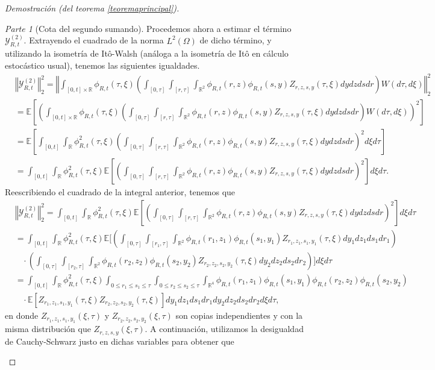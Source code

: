 \documentclass[letterpaper,twoside,12pt]{book}
\newcommand{\R}{\mathbb{R}}
\newcommand{\E}{\mathbb{E}}
\newcommand{\1}{\mathds{1}}
\newcommand{\norm}[1]{\left\Vert #1 \right\Vert}
\theoremstyle{definition}
\theoremstyle{definition}
\theoremstyle{remark}
\newtheorem{proofpart}{Parte}
\theoremstyle{definition}
\theoremstyle{definition}
\theoremstyle{definition}
\theoremstyle{definition}
\theoremstyle{definition}
\begin{document}
\begin{proof}[Demostración (del teorema \ref{teoremaprincipal})]
\begin{proofpart}[Cota del segundo sumando]
Procedemos ahora a estimar el término $\mathcal{Y}_{R,t}^{(2)}$. Extrayendo el cuadrado de la norma $L^{2}(\Omega)$ de dicho término, y utilizando la isometría de Itô-Walsh (análoga a la isometría de Itô en cálculo estocástico usual), tenemos las siguientes igualdades.
\begin{align*}
   &\norm{\mathcal{Y}_{R,t}^{(2)}}_2^{2}=\norm{\int_{[0,t]\times\R}\phi_{R,t}(\tau,\xi)\left(\int_{[0,\tau]}\int_{[r,\tau]}\int_{\R^2}\phi_{R,t}(r,z)\phi_{R,t}(s,y)Z_{r,z,s,y}(\tau,\xi)dy dz ds dr\right)W(d\tau,d\xi)}_2^2\\
   &=\E\left[\left(\int_{[0,t]\times\R}\phi_{R,t}(\tau,\xi)\left(\int_{[0,\tau]}\int_{[r,\tau]}\int_{\R^2}\phi_{R,t}(r,z)\phi_{R,t}(s,y)Z_{r,z,s,y}(\tau,\xi)dy dz ds dr\right)W(d\tau,d\xi)\right)^2\right]\\
   &=\E\left[\int_{[0,t]}\int_\R\phi_{R,t}^2(\tau,\xi)\left(\int_{[0,\tau]}\int_{[r,\tau]}\int_{\R^2}\phi_{R,t}(r,z)\phi_{R,t}(s,y)Z_{r,z,s,y}(\tau,\xi)dy dz ds dr\right)^2d\xi d\tau\right]\\
   &=\int_{[0,t]}\int_\R\phi_{R,t}^2(\tau,\xi)\E\left[\left(\int_{[0,\tau]}\int_{[r,\tau]}\int_{\R^2}\phi_{R,t}(r,z)\phi_{R,t}(s,y)Z_{r,z,s,y}(\tau,\xi)dy dz ds dr\right)^2\right]d\xi d\tau.
\end{align*}
Reescribiendo el cuadrado de la integral anterior, tenemos que 
\begin{align*}
   &\norm{\mathcal{Y}_{R,t}^{(2)}}_2^{2}=\int_{[0,t]}\int_\R\phi_{R,t}^2(\tau,\xi)\E\left[\left(\int_{[0,\tau]}\int_{[r,\tau]}\int_{\R^2}\phi_{R,t}(r,z)\phi_{R,t}(s,y)Z_{r,z,s,y}(\tau,\xi)dy dz ds dr\right)^2\right]d\xi d\tau\\
   &=\int_{[0,t]}\int_\R\phi_{R,t}^2(\tau,\xi)\E\Bigg[\left(\int_{[0,\tau]}\int_{[r_1,\tau]}\int_{\R^2}\phi_{R,t}(r_1,z_1)\phi_{R,t}(s_1,y_1)Z_{r_1,z_1,s_1,y_1}(\tau,\xi)dy_1dz_1ds_1dr_1\right)\\
   &\ \ \ \ \cdot \left(\int_{[0,\tau]}\int_{[r_2,\tau]}\int_{\R^2}\phi_{R,t}(r_2,z_2)\phi_{R,t}(s_2,y_2)Z_{r_2,z_2,s_2,y_2}(\tau,\xi)dy_2dz_2ds_2dr_2\right)\Bigg]d\xi d\tau\\
   &=\int_{[0,t]}\int_\R\phi_{R,t}^2(\tau,\xi)\int_{0\leq r_1\leq s_1\leq \tau}\int_{0\leq r_2\leq s_2\leq \tau}\int_{\R^4}\phi_{R,t}(r_1,z_1)\phi_{R,t}(s_1,y_1)\phi_{R,t}(r_2,z_2)\phi_{R,t}(s_2,y_2)\\
   &\ \ \ \ \cdot \E\left[Z_{r_1,z_1,s_1,y_1}(\tau,\xi)Z_{r_2,z_2,s_2,y_2}(\tau,\xi)\right]dy_1dz_1ds_1dr_1dy_2dz_2ds_2dr_2d\xi d\tau,
\end{align*}
en donde $Z_{r_1,z_1,s_1,y_1}(\xi,\tau)$ y $Z_{r_2,z_2,s_2,y_2}(\xi,\tau)$ son copias independientes y con la misma distribución que $Z_{r,z,s,y}(\xi,\tau)$. A continuación, utilizamos la desigualdad de Cauchy-Schwarz justo en dichas variables para obtener que 

\end{proofpart}
\end{proof}
\end{document}
